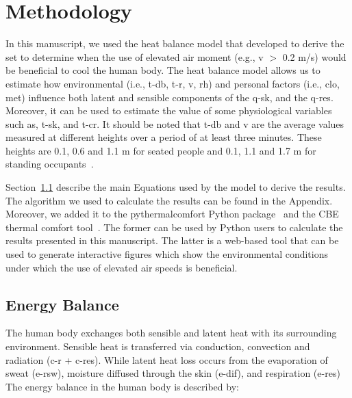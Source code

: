 
\section{Methodology}\label{sec:methodology}


In this manuscript, we used the heat balance model that  developed to derive the \ac{set} to determine when the use of elevated air moment (e.g., \ac{v} $>$ 0.2 m/s) would be beneficial to cool the human body.
The heat balance model allows us to estimate how environmental (i.e., \ac{t-db}, \ac{t-r}, \ac{v}, \ac{rh}) and personal factors (i.e., \ac{clo}, \ac{met}) influence both latent and sensible components of the \ac{q-sk}, and the \ac{q-res}.
Moreover, it can be used to estimate the value of some physiological variables such as, \ac{t-sk}, and \ac{t-cr}.
It should be noted that \ac{t-db} and \ac{v} are the average values measured at different heights over a period of at least three minutes.
These heights are 0.1, 0.6 and 1.1 m for seated people and 0.1, 1.1 and 1.7 m for standing occupants~\cite{ashrae552017}.

Section~\ref{subsec:energy-balance} describe the main Equations used by the model to derive the results.
The algorithm we used to calculate the results can be found in the Appendix.
Moreover, we added it to the pythermalcomfort Python package~\cite{Tartarini2020a} and the CBE thermal comfort tool~\cite{Tartarini2020}.
The former can be used by Python users to calculate the results presented in this manuscript.
The latter is a web-based tool that can be used to generate interactive figures which show the environmental conditions under which the use of elevated air speeds is beneficial.

\subsection{Energy Balance}\label{subsec:energy-balance}

The human body exchanges both sensible and latent heat with its surrounding environment.
Sensible heat is transferred via conduction, convection and radiation (\acs{c-r} + \acs{c-res}).
While latent heat loss occurs from the evaporation of sweat (\acs{e-rsw}), moisture diffused through the skin  (\acs{e-dif}), and respiration (\acs{e-res})
The energy balance in the human body is described by:

